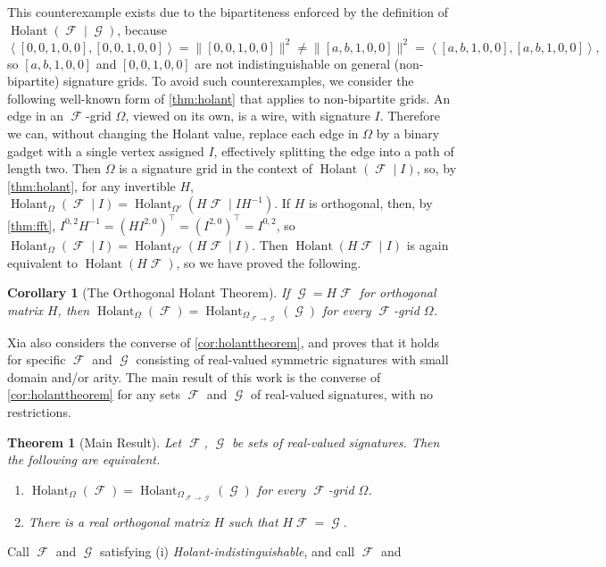 \documentclass{article}
\newtheorem{theorem}{Theorem}[section]
\newtheorem{corollary}{Corollary}[section]
\theoremstyle{remark}
\theoremstyle{definition}
\DeclareMathOperator{\fc}{\mathcal{F}}
\DeclareMathOperator{\gc}{\mathcal{G}}
\DeclareMathOperator{\holant}{Holant}
\begin{document}
This counterexample exists due to 
the bipartiteness enforced by the definition of $\holant(\fc \mid \gc)$, because
\[
    \left\langle [0,0,1,0,0],[0,0,1,0,0]\right\rangle = \|[0,0,1,0,0]\|^2
    \neq \|[a,b,1,0,0]\|^2 = \left\langle [a,b,1,0,0],[a,b,1,0,0] \right\rangle,
\]
so $[a,b,1,0,0]$ and $[0,0,1,0,0]$ are not indistinguishable on
general (non-bipartite) signature grids. To avoid such counterexamples, we consider the
following well-known form of \autoref{thm:holant} that applies to non-bipartite grids.
An edge in an $\fc$-grid $\Omega$, viewed on its own, is a wire,
with signature $I$. Therefore we can, without changing the Holant value, replace each edge in 
$\Omega$ by a binary gadget with a single vertex assigned $I$, effectively splitting the edge into a path
of length two. Then $\Omega$ is a signature grid in the context of
$\holant(\fc \mid I)$, so, by \autoref{thm:holant}, for any invertible $H$,
$\holant_\Omega(\fc \mid I) = \holant_{\Omega'}(H\fc \mid IH^{-1})$. If $H$ is orthogonal,
then, by \autoref{thm:fft}, $I^{0,2}H^{-1} = (HI^{2,0})^\top = (I^{2,0})^\top = I^{0,2}$, so
$\holant_\Omega(\fc \mid I) = \holant_{\Omega'}(H\fc \mid I)$. Then $\holant(H\fc \mid I)$
is again equivalent to $\holant(H\fc)$, so we have proved the following.
\begin{corollary}[The Orthogonal Holant Theorem]
    \label{cor:holanttheorem}
    If $\gc = H\fc$ for orthogonal matrix $H$, then $\holant_\Omega(\fc) = \holant_{\Omega_{\fc\to\gc}}(\gc)$ for every $\fc$-grid $\Omega$.
\end{corollary}
Xia \cite{xia} also considers the converse of \autoref{cor:holanttheorem}, and proves that it holds
for specific $\fc$ and $\gc$ consisting of real-valued symmetric signatures with small domain
and/or arity.
The main result of this work is the converse of \autoref{cor:holanttheorem} for any
sets $\fc$ and $\gc$ of real-valued signatures, with no restrictions.
\begin{theorem}[Main Result]
    \label{thm:result}
    Let $\fc$, $\gc$ be sets of real-valued signatures. Then the following are equivalent.
    \begin{enumerate}[label=(\roman*)]
        \item $\holant_{\Omega}(\fc) = \holant_{\Omega_{\fc\to\gc}}(\gc)$
        for every $\fc$-grid $\Omega$.
        \item There is a real orthogonal matrix $H$ such that $H\fc = \gc$.
    \end{enumerate}
\end{theorem}
Call $\fc$ and $\gc$ satisfying (i) \emph{Holant-indistinguishable}, and call $\fc$ and
\end{document}
